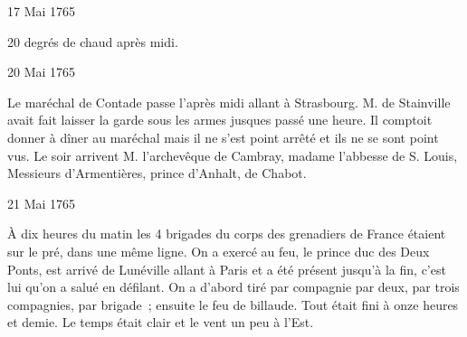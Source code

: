                     
                     \begin{diary}{17 Mai 1765}{}
                        
                        
                           20 degrés de chaud
                           après midi.
                        \bigskip
        
        
                     \end{diary}
                     \begin{diary}{20 Mai 1765}{}
                        
                        
                           Le maréchal de Contade passe l'après midi allant
                           à Strasbourg. M. de Stainville avait fait laisser
                           la garde sous les armes jusques passé une heure.
                           Il comptoit donner à dîner au maréchal mais
                           il ne s'est point arrêté et ils ne se sont point vus.
                           Le soir arrivent M. l'archevêque de
                              Cambray,
                           madame l'abbesse de S. Louis, Messieurs
                           d'Armentières, prince
                              d'Anhalt, de
                           Chabot. \bigskip
        
        
                     \end{diary}
                     \begin{diary}{21 Mai 1765}{}
                        
                         À dix heures du matin les 4
                           brigades du
                           corps des grenadiers de
                              France étaient sur le
                           pré, dans une même ligne. On a exercé
                           au feu, le prince duc des Deux Ponts, est arrivé
                           de Lunéville allant à
                              Paris et a été présent
                           jusqu'à la fin, c'est lui qu'on a salué en
                           défilant. On a d'abord tiré par compagnie
                           par deux, par trois compagnies, par
                           brigade ; ensuite le feu de billaude. Tout
                           était fini à onze heures et demie. Le temps
                           était clair et le vent un peu à l'Est. \bigskip
        
        
                     \end{diary}
